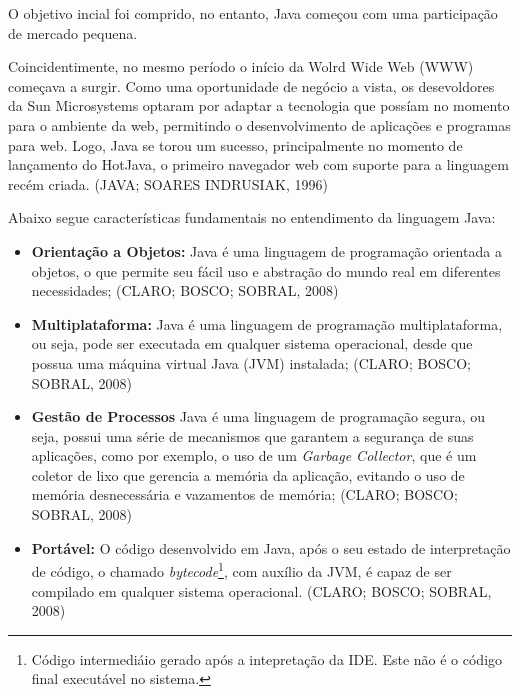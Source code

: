 \documentclass[a4paper,12pt]{article}
\begin{document}
O objetivo incial foi comprido, no entanto, Java começou com uma participação de mercado pequena. 

Coincidentimente, no mesmo período o início da Wolrd Wide Web (WWW) começava a surgir. Como uma oportunidade de negócio a vista, os desevoldores da Sun
Microsystems optaram por adaptar a tecnologia que possíam no momento para o ambiente da web, permitindo o desenvolvimento de aplicações e programas para web.
Logo, Java se torou um sucesso, principalmente no momento de lançamento do HotJava, o primeiro navegador web com suporte para a linguagem recém criada. (JAVA; SOARES INDRUSIAK, 1996)

Abaixo segue características fundamentais no entendimento da linguagem Java:
\begin{itemize}
	\item \textbf{Orientação a Objetos:} Java é uma linguagem de programação orientada a objetos, o que permite seu fácil uso e abstração do mundo real em diferentes necessidades; (CLARO; BOSCO; SOBRAL, 2008)
	\item \textbf{Multiplataforma:} Java é uma linguagem de programação multiplataforma, ou seja, pode ser executada em qualquer sistema operacional, desde que possua uma máquina virtual Java (JVM) instalada; (CLARO; BOSCO; SOBRAL, 2008)
	\item \textbf{Gestão de Processos} Java é uma linguagem de programação segura, ou seja, possui uma série de mecanismos que garantem a segurança de suas aplicações, como por exemplo, o uso de um \textit{Garbage Collector}, 
	que é um coletor de lixo que gerencia a memória da aplicação, evitando o uso de memória desnecessária e vazamentos de memória; (CLARO; BOSCO; SOBRAL, 2008)
	\item \textbf{Portável:} O código desenvolvido em Java, após o seu estado de interpretação de código, o chamado \textit{bytecode}\footnote{
		Código intermediáio gerado após a intepretação da IDE. Este não é o código final executável no sistema.
	}, com auxílio da JVM, é capaz de ser compilado em qualquer sistema operacional. (CLARO; BOSCO; SOBRAL, 2008)
\end{itemize}
\end{document}
